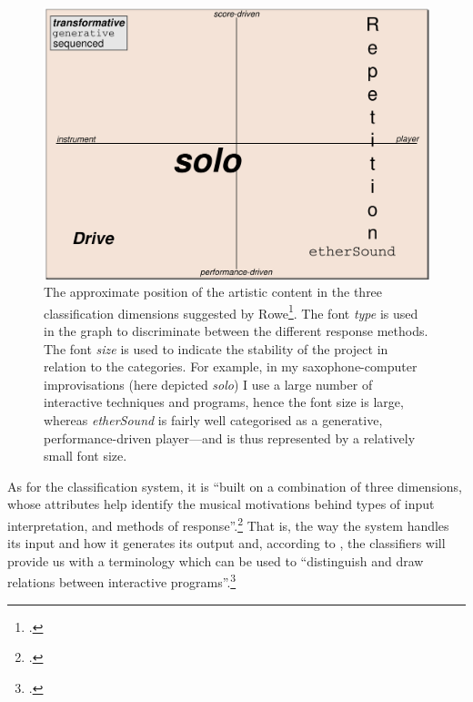 \begin{figure}[!htb]
  \centering
  \includegraphics[width=0.9\linewidth]{img/interact-class}
  \caption[A map of the artistic contents of the project.]{The approximate position of the artistic content in the three classification dimensions suggested by Rowe\footcite[5--8]{rowe}. The font \textit{type} is used in the graph to discriminate between the different response methods. The font \textit{size} is used to indicate the stability of the project in relation to the categories. For example, in my saxophone-computer improvisations (here depicted \emph{solo}) I use a large number of interactive techniques and programs, hence the font size is large, whereas \emph{etherSound} is fairly well categorised as a generative, performance-driven player---and is thus represented by a relatively small font size.}
\label{fig:interact-class}
\end{figure}


As for the classification system, it is ``built on a combination of three dimensions, whose attributes help identify the musical motivations behind types of input interpretation, and methods of response''.\footcite[6]{rowe} That is, the way the system handles its input and how it generates its output and, according to \citeauthor{rowe}, the classifiers will provide us with a terminology which can be used to ``distinguish and draw relations between interactive programs''.\footcite[7]{rowe} 


